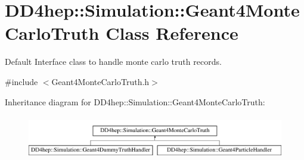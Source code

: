 \hypertarget{class_d_d4hep_1_1_simulation_1_1_geant4_monte_carlo_truth}{}\section{D\+D4hep\+:\+:Simulation\+:\+:Geant4\+Monte\+Carlo\+Truth Class Reference}
\label{class_d_d4hep_1_1_simulation_1_1_geant4_monte_carlo_truth}


Default Interface class to handle monte carlo truth records.  




{\ttfamily \#include $<$Geant4\+Monte\+Carlo\+Truth.\+h$>$}

Inheritance diagram for D\+D4hep\+:\+:Simulation\+:\+:Geant4\+Monte\+Carlo\+Truth\+:\begin{figure}[H]
\begin{center}
\leavevmode
\includegraphics[height=1.931034cm]{class_d_d4hep_1_1_simulation_1_1_geant4_monte_carlo_truth}
\end{center}
\end{figure}
